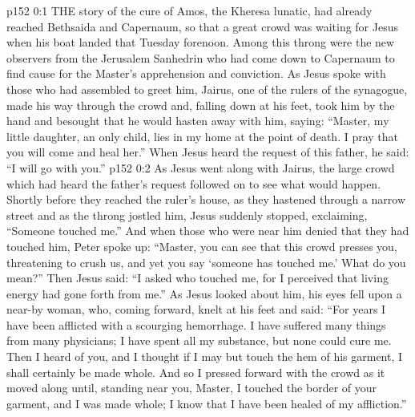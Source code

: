 \vs p152 0:1 THE story of the cure of Amos, the Kheresa lunatic, had already reached Bethsaida and Capernaum, so that a great crowd was waiting for Jesus when his boat landed that Tuesday forenoon. Among this throng were the new observers from the Jerusalem Sanhedrin who had come down to Capernaum to find cause for the Master’s apprehension and conviction. As Jesus spoke with those who had assembled to greet him, Jairus, one of the rulers of the synagogue, made his way through the crowd and, falling down at his feet, took him by the hand and besought that he would hasten away with him, saying: “Master, my little daughter, an only child, lies in my home at the point of death. I pray that you will come and heal her.” When Jesus heard the request of this father, he said: \textcolor{ubdarkred}{“I will go with you.”}
\vs p152 0:2 As Jesus went along with Jairus, the large crowd which had heard the father’s request followed on to see what would happen. Shortly before they reached the ruler’s house, as they hastened through a narrow street and as the throng jostled him, Jesus suddenly stopped, exclaiming, \textcolor{ubdarkred}{“Someone touched me.”} And when those who were near him denied that they had touched him, Peter spoke up: “Master, you can see that this crowd presses you, threatening to crush us, and yet you say ‘someone has touched me.’ What do you mean?” Then Jesus said: \textcolor{ubdarkred}{“I asked who touched me, for I perceived that living energy had gone forth from me.”} As Jesus looked about him, his eyes fell upon a near\hyp{}by woman, who, coming forward, knelt at his feet and said: “For years I have been afflicted with a scourging hemorrhage. I have suffered many things from many physicians; I have spent all my substance, but none could cure me. Then I heard of you, and I thought if I may but touch the hem of his garment, I shall certainly be made whole. And so I pressed forward with the crowd as it moved along until, standing near you, Master, I touched the border of your garment, and I was made whole; I know that I have been healed of my affliction.”

